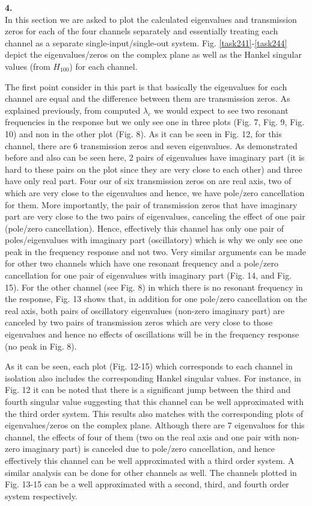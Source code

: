 \documentclass[paper=US leter, fontsize=11pt]{scrartcl}
\begin{document}
\vspace{30pt}
\textbf{4.}\\
In this section we are asked to plot the calculated eigenvalues and transmission zeros for each of the four channels separately and essentially treating each channel as a separate single-input/single-out system. Fig. \ref{task241}-\ref{task244} depict the eigenvalues/zeros on the complex plane as well as the Hankel singular values (from $H_{100}$) for each channel.

The first point consider in this part is that basically the eigenvalues for each channel are equal and the difference between them are transmission zeros. As explained previously, from computed $\lambda_{c}$ we would expect to see two resonant frequencies in the response but we only see one in three plots (Fig. 7, Fig. 9, Fig. 10) and non in the other plot (Fig. 8). 
As it can be seen in Fig. 12, for this channel, there are 6 transmission zeros and seven eigenvalues. As demonstrated before and also can be seen here, 2 pairs of eigenvalues have imaginary part (it is hard to these pairs on the plot since they are very close to each other) and three have only real part. Four our of six transmission zeros on are real axis, two of which are very close to the eigenvalues and hence, we have pole/zero cancellation for them. More importantly, the pair of transmission zeros that have imaginary part are very close to the two pairs of eigenvalues, canceling the effect of one pair (pole/zero cancellation). Hence, effectively this channel has only one pair of poles/eigenvalues with imaginary part (oscillatory) which is why we only see one peak in the frequency response and not two. Very similar arguments can be made for other two channels which have one resonant frequency and a pole/zero cancellation for one pair of eigenvalues with imaginary part (Fig. 14, and Fig. 15). For the other channel (see Fig. 8) in which there is no resonant frequency in the response, Fig. 13 shows that, in addition for one pole/zero cancellation on the real axis, both pairs of oscillatory eigenvalues (non-zero imaginary part) are canceled by two pairs of transmission zeros which are very close to those eigenvalues and hence no effects of oscillations will be in the frequency response (no peak in Fig. 8). 

As it can be seen, each plot (Fig. 12-15) which corresponds to each channel in isolation also includes the corresponding Hankel singular values. For instance, in Fig. 12 it can be noted that there is a significant jump between the third and fourth singular value suggesting that this channel can be well approximated with the third order system. This results also matches with the corresponding plots of eigenvalues/zeros on the complex plane. Although there are 7 eigenvalues for this channel, the effects of four of them (two on the real axis and one pair with non-zero imaginary part) is canceled due to pole/zero cancellation, and hence effectively this channel can be well approximated with a third order system. A similar analysis can be done for other channels as well. The channels plotted in Fig. 13-15 can be a well approximated with a second, third, and fourth order system respectively.
\end{document}
